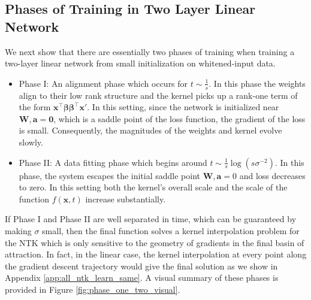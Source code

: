 \documentclass{article} %
\def\x{\bm x}
\begin{document}
\subsection{Phases of Training in Two Layer Linear Network}

We next show that there are essentially two phases of training when training a two-layer linear network from small initialization on whitened-input data. 
\begin{itemize}[leftmargin=*]
    \item Phase I: An alignment phase which occurs for $t \sim \frac{1}{s}$. In this phase the weights align to their low rank structure and the kernel picks up a rank-one term of the form $\bm x^\top \bm \beta \bm \beta^\top \bm x'$. In this setting, since the network is initialized near $\bm W, \bm a = \bm 0$, which is a saddle point of the loss function, the gradient of the loss is small. Consequently, the magnitudes of the weights and kernel evolve slowly.
    \item Phase II: A data fitting phase which begins around $t \sim \frac{1}{s} \log(s  \sigma^{- 2} )$. In this phase, the system escapes the initial saddle point $\bm W, \bm a =  0$ and loss decreases to zero. In this setting both the kernel's overall scale and the scale of the function $f(\x,t)$ increase substantially. 
\end{itemize}
If Phase I and Phase II are well separated in time, which can be guaranteed by making $\sigma$ small, then the final function solves a kernel interpolation problem for the NTK which is only sensitive to the geometry of gradients in the final basin of attraction. In fact, in the linear case, the kernel interpolation at every point along the gradient descent trajectory would give the final solution as we show in Appendix \ref{app:all_ntk_learn_same}. A visual summary of these phases is provided in Figure \ref{fig:phase_one_two_visual}. 
\end{document}
